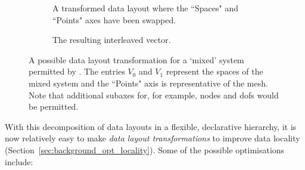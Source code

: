 \begin{figure}
\begin{subfigure}{.65\textwidth}
    \caption{A transformed data layout where the ``Spaces" and ``Points" axes have been swapped.}
    \label{fig:mixedreorder_inner}
  \end{subfigure}
  \hfill
  \begin{subfigure}{.3\textwidth}
    \centering
    \caption{The resulting interleaved vector.}
    \label{fig:mixedreorder_inner_vec}
  \end{subfigure}
  \caption{
    A possible data layout transformation for a `mixed' system permitted by .
    The entries $V_0$ and $V_1$ represent the spaces of the mixed system and the ``Points" axis is representative of the mesh.
    Note that additional subaxes for, for example, nodes and \glspl{dof} would be permitted.
  }
  \label{fig:mixedreorder}
\end{figure}

With this decomposition of data layouts in a flexible, declarative hierarchy, it is now relatively easy to make \textit{data layout transformations} to improve data locality (Section~\ref{sec:background_opt_locality}).
Some of the possible optimisations include:

